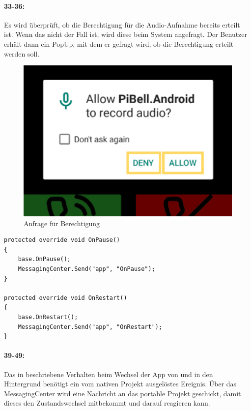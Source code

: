 \paragraph{33-36:} Es wird überprüft, ob die Berechtigung für die Audio-Aufnahme bereits erteilt ist.
Wenn das nicht der Fall ist, wird diese beim System angefragt.
Der Benutzer erhält dann ein PopUp, mit dem er gefragt wird, ob die Berechtigung erteilt werden soll.
\begin{figure}[H]
    \centering
    \includegraphics[width=.5\linewidth]{images/xamarin/permissionRequest.png}
    \caption{Anfrage für Berechtigung}
\end{figure}

\begin{verbatim}
protected override void OnPause()
{
    base.OnPause();
    MessagingCenter.Send("app", "OnPause");
}

protected override void OnRestart()
{
    base.OnRestart();
    MessagingCenter.Send("app", "OnRestart");
}
\end{verbatim}
\paragraph{39-49:} Das in  beschriebene Verhalten beim Wechsel der App von und in den Hintergrund benötigt ein vom nativen Projekt ausgelöstes Ereignis.
Über das MessagingCenter wird eine Nachricht an das portable Projekt geschickt, damit dieses den Zustandswechsel mitbekommt und darauf reagieren kann.
